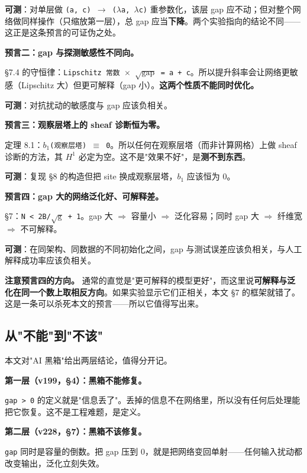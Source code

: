 \documentclass[11pt,a4paper]{ctexart}
\begin{document}
\textbf{可测}：对单层做 \texttt{(a, c) \ensuremath{\to} (\ensuremath{\lambda}a, \ensuremath{\lambda}c)} 重参数化，该层 gap 应不动；但对整个网络做同样操作（只缩放第一层），总 gap 应当\textbf{下降}。两个实验指向的结论不同——这正是这条预言的可证伪之处。

\textbf{预言二：gap 与探测敏感性不同向。}

§7.4 的守恒律：\texttt{Lipschitz 常数 \ensuremath{\times} \ensuremath{\sqrt{\mathrm{gap}}} = a + c}。所以提升斜率会让网络更敏感（Lipschitz 大）但更可解释（gap 小）。\textbf{这两个性质不能同时优化。}

\textbf{可测}：对抗扰动的敏感度与 gap 应该负相关。

\textbf{预言三：观察层塔上的 sheaf 诊断恒为零。}

定理 8.1：\texttt{\ensuremath{b_{1}}(观察层塔) \ensuremath{\equiv} 0}。所以任何在观察层塔（而非计算网格）上做 sheaf 诊断的方法，其 \texttt{\ensuremath{H^{1}}} 必定为空。这不是"效果不好"，是\textbf{测不到东西}。

\textbf{可测}：复现 §8 的构造但把 site 换成观察层塔，\texttt{\ensuremath{b_{1}}} 应该恒为 0。

\textbf{预言四：gap 大的网络泛化好、可解释差。}

§7：\texttt{N < 2B/\ensuremath{\sqrt{\mathrm{g}}} + 1}。gap 大 \ensuremath{\Longrightarrow} 容量小 \ensuremath{\Longrightarrow} 泛化容易；同时 gap 大 \ensuremath{\Longrightarrow} 纤维宽 \ensuremath{\Longrightarrow} 不可解释。

\textbf{可测}：在同架构、同数据的不同初始化之间，gap 与测试误差应该负相关，与人工解释成功率应该负相关。

\textbf{注意预言四的方向。} 通常的直觉是"更可解释的模型更好"，而这里说\textbf{可解释与泛化在同一个数上取相反方向}。如果实验显示它们正相关，本文 §7 的框架就错了。这是一条可以杀死本文的预言——所以它值得写出来。

\subsection{从"不能"到"不该"}

本文对"AI 黑箱"给出两层结论，值得分开记。

\textbf{第一层（v199，§4）：黑箱不能修复。}

\texttt{gap > 0} 的定义就是"信息丢了"。丢掉的信息不在网络里，所以没有任何后处理能把它恢复。这不是工程难题，是定义。

\textbf{第二层（v228，§7）：黑箱不该修复。}

\texttt{gap} 同时是容量的倒数。把 gap 压到 0，就是把网络变回单射——任何输入扰动都改变输出，泛化立刻失效。
\end{document}
